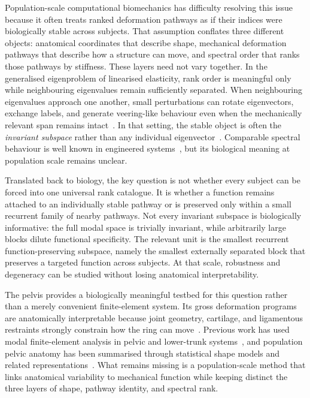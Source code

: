 \documentclass[11pt]{article}
\begin{document}
Population-scale computational biomechanics has difficulty resolving this issue because it often treats ranked deformation pathways as if their indices were biologically stable across subjects.
That assumption conflates three different objects: anatomical coordinates that describe shape, mechanical deformation pathways that describe how a structure can move, and spectral order that ranks those pathways by stiffness.
These layers need not vary together.
In the generalised eigenproblem of linearised elasticity, rank order is meaningful only while neighbouring eigenvalues remain sufficiently separated.
When neighbouring eigenvalues approach one another, small perturbations can rotate eigenvectors, exchange labels, and generate veering-like behaviour even when the mechanically relevant span remains intact~\citep{Pierre1988,ManconiMace2017}.
In that setting, the stable object is often the \emph{invariant subspace} rather than any individual eigenvector~\citep{GhoshGhanem2012}.
Comparable spectral behaviour is well known in engineered systems~\citep{Hussein2014,Cummer2016}, but its biological meaning at population scale remains unclear.

Translated back to biology, the key question is not whether every subject can be forced into one universal rank catalogue.
It is whether a function remains attached to an individually stable pathway or is preserved only within a small recurrent family of nearby pathways.
Not every invariant subspace is biologically informative: the full modal space is trivially invariant, while arbitrarily large blocks dilute functional specificity.
The relevant unit is the smallest recurrent function-preserving subspace, namely the smallest externally separated block that preserves a targeted function across subjects.
At that scale, robustness and degeneracy can be studied without losing anatomical interpretability.

The pelvis provides a biologically meaningful testbed for this question rather than a merely convenient finite-element system.
Its gross deformation programs are anatomically interpretable because joint geometry, cartilage, and ligamentous restraints strongly constrain how the ring can move~\citep{Snijders1993,Vleeming2012,Goode2008}.
Previous work has used modal finite-element analysis in pelvic and lower-trunk systems~\citep{GuoTeo2005,Fan2021Modal}, and population pelvic anatomy has been summarised through statistical shape models and related representations~\citep{Kriechling2022}.
What remains missing is a population-scale method that links anatomical variability to mechanical function while keeping distinct the three layers of shape, pathway identity, and spectral rank.
\end{document}
